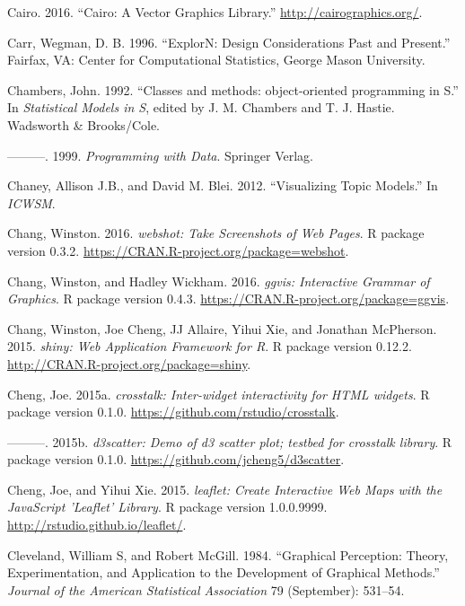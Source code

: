 \documentclass[12pt,]{isuthesis}
\begin{document}
\hypertarget{ref-cairo}{}
Cairo. 2016. ``Cairo: A Vector Graphics Library.''
\url{http://cairographics.org/}.

\hypertarget{ref-brushing-pcp}{}
Carr, Wegman, D. B. 1996. ``ExplorN: Design Considerations Past and
Present.'' Fairfax, VA: Center for Computational Statistics, George
Mason University.

\hypertarget{ref-S3}{}
Chambers, John. 1992. ``Classes and methods: object-oriented programming
in S.'' In \emph{Statistical Models in S}, edited by J. M. Chambers and
T. J. Hastie. Wadsworth \& Brooks/Cole.

\hypertarget{ref-Chambers:1999}{}
---------. 1999. \emph{Programming with Data}. Springer Verlag.

\hypertarget{ref-Blei-2012}{}
Chaney, Allison J.B., and David M. Blei. 2012. ``Visualizing Topic
Models.'' In \emph{ICWSM}.

\hypertarget{ref-webshot}{}
Chang, Winston. 2016. \emph{webshot: Take Screenshots of Web Pages}. R
package version 0.3.2. \url{https://CRAN.R-project.org/package=webshot}.

\hypertarget{ref-ggvis}{}
Chang, Winston, and Hadley Wickham. 2016. \emph{ggvis: Interactive
Grammar of Graphics}. R package version 0.4.3.
\url{https://CRAN.R-project.org/package=ggvis}.

\hypertarget{ref-shiny}{}
Chang, Winston, Joe Cheng, JJ Allaire, Yihui Xie, and Jonathan
McPherson. 2015. \emph{shiny: Web Application Framework for R}. R
package version 0.12.2. \url{http://CRAN.R-project.org/package=shiny}.

\hypertarget{ref-crosstalk}{}
Cheng, Joe. 2015a. \emph{crosstalk: Inter-widget interactivity for HTML
widgets}. R package version 0.1.0.
\url{https://github.com/rstudio/crosstalk}.

\hypertarget{ref-d3scatter}{}
---------. 2015b. \emph{d3scatter: Demo of d3 scatter plot; testbed for
crosstalk library}. R package version 0.1.0.
\url{https://github.com/jcheng5/d3scatter}.

\hypertarget{ref-leaflet}{}
Cheng, Joe, and Yihui Xie. 2015. \emph{leaflet: Create Interactive Web
Maps with the JavaScript 'Leaflet' Library}. R package version
1.0.0.9999. \url{http://rstudio.github.io/leaflet/}.

\hypertarget{ref-graphical-perception}{}
Cleveland, William S, and Robert McGill. 1984. ``Graphical Perception:
Theory, Experimentation, and Application to the Development of Graphical
Methods.'' \emph{Journal of the American Statistical Association} 79
(September): 531--54.
\end{document}
